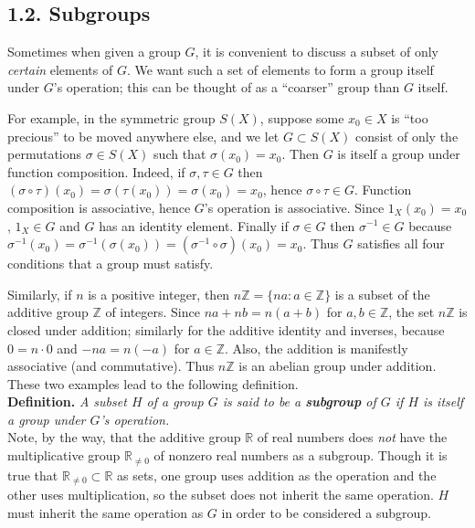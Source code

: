 \documentclass[leqno]{book}
\begin{document}
\subsection*{1.2. Subgroups}
Sometimes when given a group $G$, it is convenient to discuss a subset of only \emph{certain} elements of $G$.  We want such a set of elements to form a group itself under $G$'s operation; this can be thought of as a ``coarser'' group than $G$ itself.

For example, in the symmetric group $S(X)$, suppose some $x_0\in X$ is ``too precious'' to be moved anywhere else, and we let $G\subset S(X)$ consist of only the permutations $\sigma\in S(X)$ such that $\sigma(x_0)=x_0$.  Then $G$ is itself a group under function composition.  Indeed, if $\sigma,\tau\in G$ then $(\sigma\circ\tau)(x_0)=\sigma(\tau(x_0))=\sigma(x_0)=x_0$, hence $\sigma\circ\tau\in G$.  Function composition is associative, hence $G$'s operation is associative.  Since $1_X(x_0)=x_0$, $1_X\in G$ and $G$ has an identity element.  Finally if $\sigma\in G$ then $\sigma^{-1}\in G$ because $\sigma^{-1}(x_0)=\sigma^{-1}(\sigma(x_0))=(\sigma^{-1}\circ\sigma)(x_0)=x_0$.  Thus $G$ satisfies all four conditions that a group must satisfy.

Similarly, if $n$ is a positive integer, then $n\mathbb Z=\{na:a\in\mathbb Z\}$ is a subset of the additive group $\mathbb Z$ of integers.  Since $na+nb=n(a+b)$ for $a,b\in\mathbb Z$, the set $n\mathbb Z$ is closed under addition; similarly for the additive identity and inverses, because $0=n\cdot 0$ and $-na=n(-a)$ for $a\in\mathbb Z$.  Also, the addition is manifestly associative (and commutative).  Thus $n\mathbb Z$ is an abelian group under addition.  These two examples lead to the following definition.\\

\noindent\textbf{Definition.} \emph{A subset $H$ of a group $G$ is said to be a \textbf{subgroup} of $G$ if $H$ is itself a group under $G$'s operation.}\\

\noindent Note, by the way, that the additive group $\mathbb R$ of real numbers does \emph{not} have the multiplicative group $\mathbb R_{\ne 0}$ of nonzero real numbers as a subgroup.  Though it is true that $\mathbb R_{\ne 0}\subset\mathbb R$ as sets, one group uses addition as the operation and the other uses multiplication, so the subset does not inherit the same operation.  $H$ must inherit the same operation as $G$ in order to be considered a subgroup.\\
\end{document}
